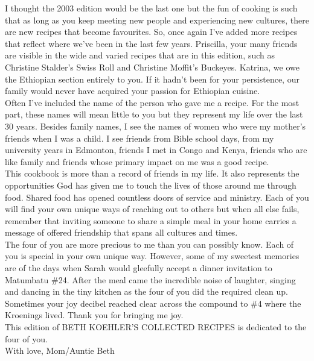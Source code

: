 \documentclass[10pt]{memoir} %
\begin{document}
I thought the 2003 edition would be the last one but the fun of cooking is such that as long as you keep meeting new people and experiencing new cultures, there are new recipes that become favourites. So, once again I've added more recipes that reflect where we've been in the last few years. Priscilla, your many friends are visible in the wide and varied recipes that are in this edition, such as Christine Stalder's Swiss Roll and Christine Moffit's Buckeyes. Katrina, we owe the Ethiopian section entirely to you. If it hadn't been for your persistence, our family would never have acquired your passion for Ethiopian cuisine. \\[10pt]
Often I've included the name of the person who gave me a recipe. For the most part, these names will mean little to you but they represent my life over the last 30 years. Besides family names, I see the names of women who were my mother's friends when I was a child. I see friends from Bible school days, from my university years in Edmonton, friends I met in Congo and Kenya, friends who are like family and friends whose primary impact on me was a good recipe. \\[10pt]
This cookbook is more than a record of friends in my life. It also represents the opportunities God has given me to touch the lives of those around me through food. Shared food has opened countless doors of service and ministry. Each of you will find your own unique ways of reaching out to others but when all else fails, remember that inviting someone to share a simple meal in your home carries a message of offered friendship that spans all cultures and times. \\[10pt]
The four of you are more precious to me than you can possibly know. Each of you is special in your own unique way. However, some of my sweetest memories are of the days when Sarah would gleefully accept a dinner invitation to Matumbatu \#24. After the meal came the incredible noise of laughter, singing and dancing in the tiny kitchen as the four of you did the required clean up. Sometimes your joy decibel reached clear across the compound to \#4 where the Kroenings lived. Thank you for bringing me joy. \\[10pt]
This edition of BETH KOEHLER'S COLLECTED RECIPES is dedicated to the four of you. \\[10pt]
\hspace{0.5\linewidth}With love, Mom/Auntie Beth
\end{document}
